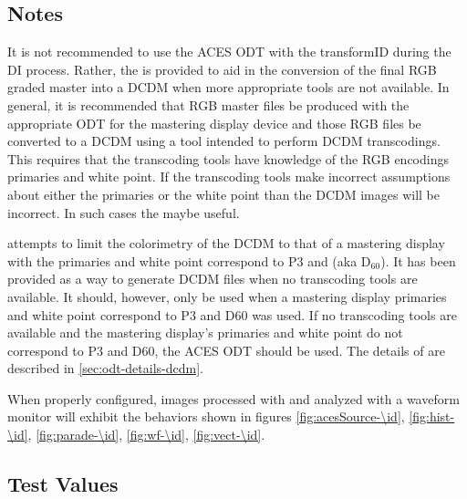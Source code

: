 \subsection{Notes}
\label{subsec:notes-\id}

It is not recommended to use the ACES ODT with the transformID \transformID{\id} during the DI process.  Rather, the \transformID{\id} is provided to aid in the conversion of the final RGB graded master into a DCDM when more appropriate tools are not available.  In general, it is recommended that RGB master files be produced with the appropriate ODT for the mastering display device and those RGB files be converted to a DCDM using a tool intended to perform DCDM transcodings. This requires that the transcoding tools have knowledge of the RGB encodings primaries and white point.  If the transcoding tools make incorrect assumptions about either the primaries or the white point than the DCDM images will be incorrect.  In such cases the  maybe useful.  

\transformID{\id} attempts to limit the colorimetry of the DCDM to that of a  mastering display with the primaries and white point correspond to P3 and  (aka D$_{60}$). It has been provided as a way to generate DCDM files when no transcoding tools are available.  It should, however, only be used when a mastering display primaries and white point correspond to P3 and D60 was used.  If no transcoding tools are available and the mastering display's primaries and white point do not correspond to P3 and D60, the ACES ODT  should be used. The details of  are described in \ref{sec:odt-details-dcdm}. 

When properly configured, images processed with \transformID{\id} and analyzed with a waveform monitor will exhibit the behaviors shown in figures \ref{fig:acesSource-\id}, \ref{fig:hist-\id}, \ref{fig:parade-\id}, \ref{fig:wf-\id}, \ref{fig:vect-\id}.


\subsection{Test Values}
\label{subsec:testValues-\id}

\testValuesSubSec{}


